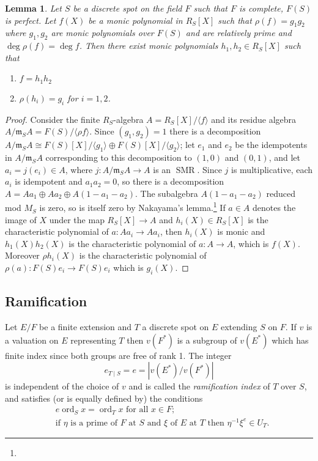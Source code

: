 \documentclass[10pt,leqno]{article}
\newtheorem{lemm}[theo]{Lemma}
\theoremstyle{definition}
\def\<{\langle}
\def\>{\rangle}
\def\mm{\mathfrak{m}}
\DeclareMathOperator{\ord}{ord}
\def\fnfoni{}
\begin{document}
\begin{lemm}
\label{4.5.5}
Let $S$ be a discrete spot on the field $F$ such that $F$ is complete, $F(S)$ is perfect.
Let $f(X)$ be a monic polynomial in $R_S[X]$ such that $\rho(f) = g_1g_2$ where $g_1,g_2$ are monic polynomials over $F(S)$ and are relatively prime and $\deg \rho(f) = \deg f$.
Then there exist monic polynomials $h_1,h_2 \in R_S[X]$ such that
\begin{enumerate}
\item
$f = h_1 h_2$

\item
$\rho(h_i) = g_i$ for $i = 1,2$.
\end{enumerate}
\end{lemm}

\begin{proof}
Consider the finite $R_S$-algebra $A = R_S[X]/\<f\>$ and its residue algebra $A/\mm_S A = F(S)/\<\rho f\>$.
Since $(g_1,g_2) = 1$ there is a decomposition $A/\mm_S A \cong F(S)[X]/\< g_1 \> \oplus F(S)[X] / \<g_2\>$; let $e_1$ and $e_2$ be the idempotents in $A/\mm_S A$ corresponding to this decomposition to $(1,0)$ and $(0,1)$, and let $a_i = j(e_i) \in A$, where $j : A / \mm_S A \to A$ is an $\operatorname{SMR}$.
Since $j$ is multiplicative, each $a_i$ is idempotent and $a_1 a_2 = 0$, so there is a decomposition $A = A a_1 \oplus A a_2 \oplus A(1 - a_1 - a_2)$.
The subalgebra $A(1 - a_1 - a_2)$ reduced mod $M_S$ is zero, so is itself zero by Nakayama's lemma.\footnote{\fnfoni}
If $a \in A$ denotes the image of $X$ under the map $R_S[X] \to A$ and $h_i(X) \in R_S[X]$ is the characteristic polynomial of $a : A a_i \to A a_i$, then $h_i(X)$ is monic and $h_1(X) h_2(X)$ is the characteristic polynomial of $a : A \to A$, which is $f(X)$.
Moreover $\rho h_i(X)$ is the characteristic polynomial of $\rho(a) : F(S) e_i \to F(S) e_i$ which is $g_i(X)$.
\end{proof}


\subsection{Ramification}
\label{ch:4.6}

Let $E/F$ be a finite extension and $T$ a discrete spot on $E$ extending $S$ on $F$.
If $v$ is a valuation on $E$ representing $T$ then $v(F^*)$ is a subgroup of $v(E^*)$ which has finite index since both groups are free of rank 1.
The integer
\begin{equation}
\label{4.6.1}
e_{T \mid S} = e = | v(E^*) / v(F^*) |
\end{equation}
is independent of the choice of $v$ and is called the \emph{ramification index} of $T$ over $S$, and satisfies (or is equally defined  by) the conditions
\begin{align}
\label{4.6.2}
&\text{$e \ord_S x = \ord_T x$ for all $x \in F$;}
\\
\label{4.6.3}
&\text{if $\eta$ is a prime of $F$ at $S$ and $\xi$ of $E$ at $T$ then $\eta^{-1} \xi^e \in U_T$.}
\end{align}
\end{document}
